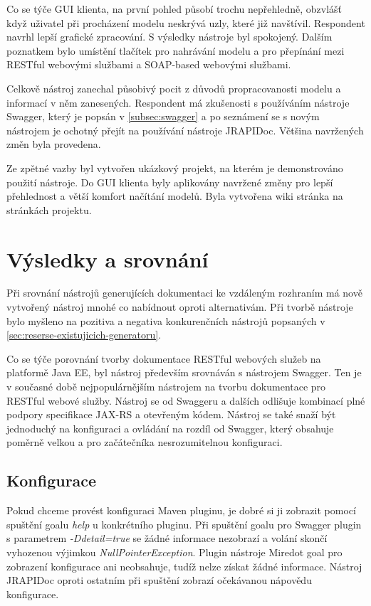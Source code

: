 \documentclass[11pt,twoside,a4paper]{book}
\begin{document}
Co se týče GUI klienta, na první pohled působí trochu nepřehledně, obzvlášť když
uživatel při procházení modelu neskrývá uzly, které již navštívil. Respondent
navrhl lepší grafické zpracování. S výsledky nástroje byl spokojený.
Dalším poznatkem bylo umístění tlačítek pro nahrávání modelu a pro přepínání
mezi RESTful webovými službami a SOAP-based webovými službami.

Celkově nástroj zanechal působivý pocit z důvodů propracovanosti modelu a informací v něm
zanesených. Respondent má zkušenosti s používáním nástroje Swagger, který je
popsán v \ref{subsec:swagger} a po seznámení se s novým nástrojem je ochotný přejít na
používání nástroje JRAPIDoc. Většina navržených změn byla provedena.

Ze zpětné vazby byl vytvořen ukázkový projekt, na kterém je demonstrováno použití nástroje.
Do GUI klienta byly aplikovány navržené změny pro lepší přehlednost a větší komfort
načítání modelů. Byla vytvořena wiki stránka na stránkách projektu.

\chapter{Výsledky a srovnání}
\label{ch:vysledky-a-srovnani}

Při srovnání nástrojů generujících dokumentaci ke vzdáleným rozhraním má nově
vytvořený nástroj mnohé co nabídnout oproti alternativám. Při tvorbě nástroje
bylo myšleno na pozitiva a negativa konkurenčních nástrojů popsaných v
\ref{sec:reserse-existujicich-generatoru}.

Co se týče porovnání tvorby dokumentace RESTful webových služeb na platformě
Java EE, byl nástroj především srovnáván s nástrojem Swagger. Ten je v současné
době nejpopulárnějším nástrojem na tvorbu dokumentace pro RESTful webové služby.
Nástroj se od Swaggeru a dalších odlišuje kombinací plné podpory specifikace
JAX-RS a otevřeným kódem. Nástroj se také snaží být jednoduchý na konfiguraci a
ovládání na rozdíl od Swagger, který obsahuje poměrně velkou a pro začátečníka
nesrozumitelnou konfiguraci.

\section{Konfigurace}

Pokud chceme provést konfiguraci Maven pluginu, je dobré si ji zobrazit pomocí
spuštění goalu {\em help} u konkrétního pluginu. Při spuštění goalu pro Swagger
plugin s parametrem {\em -Ddetail=true} se žádné informace nezobrazí a volání
skončí vyhozenou výjimkou {\em NullPointerException}. Plugin nástroje Miredot
goal pro zobrazení konfigurace ani neobsahuje, tudíž nelze získat žádné
informace. Nástroj JRAPIDoc oproti ostatním při spuštění zobrazí očekávanou
nápovědu konfigurace.
\end{document}
